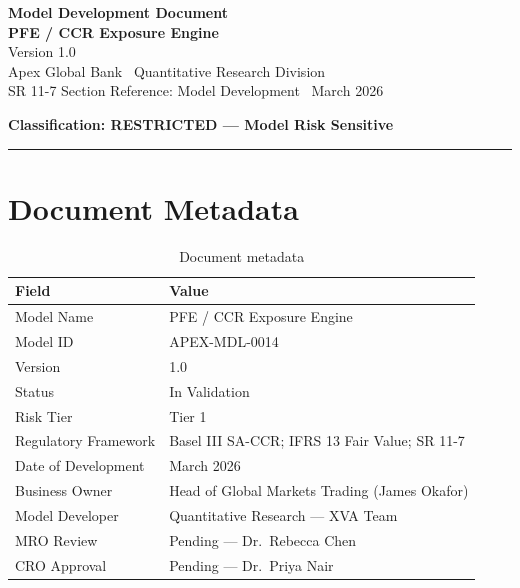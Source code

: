 \documentclass[11pt,a4paper]{article}
\begin{document}

\begin{center}
  {\LARGE\bfseries\color{apexblue} Model Development Document}\\[0.4em]
  {\Large\bfseries PFE / CCR Exposure Engine}\\[0.3em]
  {\large Version 1.0}\\[0.6em]
  {\normalsize Apex Global Bank \textbar\ Quantitative Research Division}\\[0.2em]
  {\small\color{apexgray} SR 11-7 Section Reference: Model Development \textbar\ March 2026}
\end{center}

\vspace{1em}
\textcolor{apexred}{\textbf{Classification: RESTRICTED --- Model Risk Sensitive}}
\vspace{1em}

\hrule
\vspace{1em}

\section{Document Metadata}

\begin{table}[h!]
\centering
\begin{tabular}{@{}ll@{}}
\toprule
\textbf{Field} & \textbf{Value} \\
\midrule
Model Name           & PFE / CCR Exposure Engine \\
Model ID             & APEX-MDL-0014 \\
Version              & 1.0 \\
Status               & In Validation \\
Risk Tier            & Tier 1 \\
Regulatory Framework & Basel III SA-CCR; IFRS 13 Fair Value; SR 11-7 \\
Date of Development  & March 2026 \\
Business Owner       & Head of Global Markets Trading (James Okafor) \\
Model Developer      & Quantitative Research --- XVA Team \\
MRO Review           & Pending --- Dr.\ Rebecca Chen \\
CRO Approval         & Pending --- Dr.\ Priya Nair \\
\bottomrule
\end{tabular}
\caption{Document metadata}
\end{table}
\end{document}
